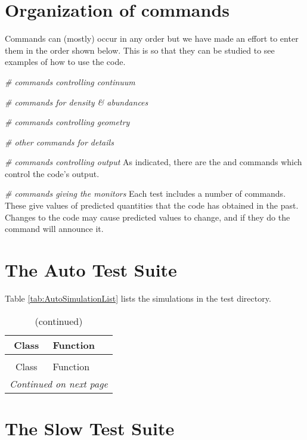 \section{Organization of commands}

Commands can (mostly) occur in any order but we have made an effort to
enter them in the order shown below.
This is so that they can be studied to see examples of how to
use the code.

\emph{\# commands controlling continuum}

\emph{\# commands for density \& abundances}

\emph{\# commands controlling geometry}

\emph{\# other commands for details}

\emph{\# commands controlling output}
As indicated, there are the  and  commands
which control the code's output.

\emph{\# commands giving the monitors}
Each test includes a number of  commands.
These give values of predicted quantities that the code has
obtained in the past.
Changes to the code may cause predicted values to change,
and if they do the  command will
announce it.

\section{The Auto Test Suite}

Table \ref{tab:AutoSimulationList} lists the simulations in the 
 test directory.

\begin{longtable}{cp{}}
\caption{The simulations in the auto test suite.}\\
\hline
Class & Function\\
\hline
\endfirsthead
\caption{(continued)}\\
\hline
Class & Function\\
\hline
\endhead
\hline\multicolumn{2}{r}{\textit{Continued on next page}}
\endfoot
\hline
\endlastfoot

\label{tab:AutoSimulationList}
\end{longtable}



\section{The Slow Test Suite}

